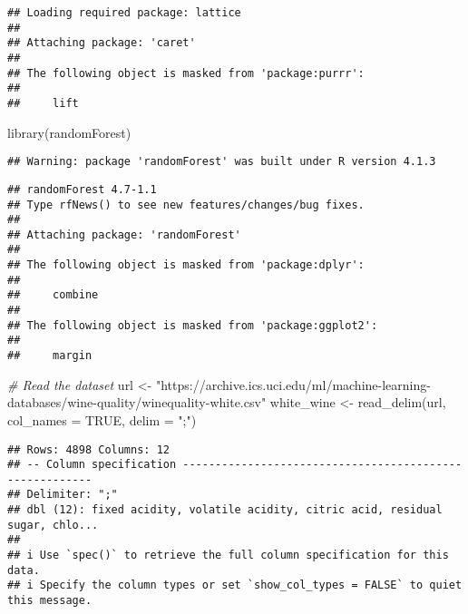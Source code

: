 \documentclass[
]{article}
\newenvironment{Shaded}{\begin{snugshade}}{\end{snugshade}}
\newcommand{\AttributeTok}[1]{\textcolor[rgb]{0.77,0.63,0.00}{#1}}
\newcommand{\CommentTok}[1]{\textcolor[rgb]{0.56,0.35,0.01}{\textit{#1}}}
\newcommand{\ConstantTok}[1]{\textcolor[rgb]{0.00,0.00,0.00}{#1}}
\newcommand{\FunctionTok}[1]{\textcolor[rgb]{0.00,0.00,0.00}{#1}}
\newcommand{\NormalTok}[1]{#1}
\newcommand{\OtherTok}[1]{\textcolor[rgb]{0.56,0.35,0.01}{#1}}
\newcommand{\StringTok}[1]{\textcolor[rgb]{0.31,0.60,0.02}{#1}}
\begin{document}
\begin{verbatim}
## Loading required package: lattice
## 
## Attaching package: 'caret'
## 
## The following object is masked from 'package:purrr':
## 
##     lift
\end{verbatim}

\begin{Shaded}
\begin{Highlighting}[]
\FunctionTok{library}\NormalTok{(randomForest)}
\end{Highlighting}
\end{Shaded}

\begin{verbatim}
## Warning: package 'randomForest' was built under R version 4.1.3
\end{verbatim}

\begin{verbatim}
## randomForest 4.7-1.1
## Type rfNews() to see new features/changes/bug fixes.
## 
## Attaching package: 'randomForest'
## 
## The following object is masked from 'package:dplyr':
## 
##     combine
## 
## The following object is masked from 'package:ggplot2':
## 
##     margin
\end{verbatim}

\begin{Shaded}
\begin{Highlighting}[]
\CommentTok{\# Read the dataset}
\NormalTok{url }\OtherTok{\textless{}{-}} \StringTok{"https://archive.ics.uci.edu/ml/machine{-}learning{-}databases/wine{-}quality/winequality{-}white.csv"}
\NormalTok{white\_wine }\OtherTok{\textless{}{-}} \FunctionTok{read\_delim}\NormalTok{(url, }\AttributeTok{col\_names =} \ConstantTok{TRUE}\NormalTok{, }\AttributeTok{delim =} \StringTok{";"}\NormalTok{)}
\end{Highlighting}
\end{Shaded}

\begin{verbatim}
## Rows: 4898 Columns: 12
## -- Column specification --------------------------------------------------------
## Delimiter: ";"
## dbl (12): fixed acidity, volatile acidity, citric acid, residual sugar, chlo...
## 
## i Use `spec()` to retrieve the full column specification for this data.
## i Specify the column types or set `show_col_types = FALSE` to quiet this message.
\end{verbatim}
\end{document}
